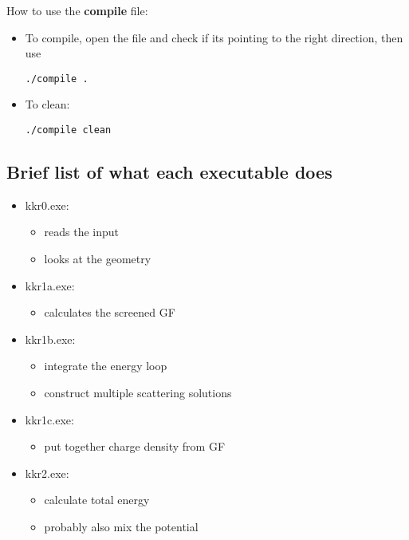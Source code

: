 \documentclass[a4paper,10pt,fullpage]{report}
\begin{document}
How to use the \textbf{compile} file:

\begin{itemize}
\item To compile, open the file and check if its pointing to the right direction, then
use \\
\begin{verbatim}
./compile .
\end{verbatim} 
\item To clean:
\begin{verbatim}
./compile clean
\end{verbatim} 

 \end{itemize}

\subsection{Brief list of what each executable does}
\label{sec:executables}

\begin{itemize}

\item kkr0.exe: 
\begin{itemize}
\item reads the input
\item looks at the geometry
\end{itemize}

\item kkr1a.exe: 
\begin{itemize}
\item calculates the screened GF
\end{itemize}

\item kkr1b.exe: 
\begin{itemize}
\item integrate the energy loop 
\item construct multiple scattering solutions
\end{itemize}

\item kkr1c.exe: 
\begin{itemize}
\item put together charge density from GF
\end{itemize}

\item kkr2.exe: 
\begin{itemize}
\item calculate total energy
\item probably also mix the potential
\end{itemize}

\end{itemize}
\end{document}
